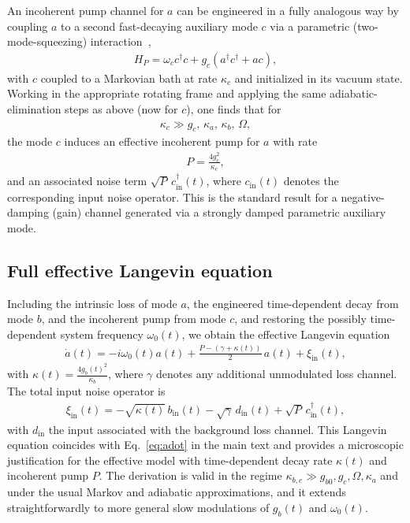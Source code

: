\documentclass[prl,twocolumn,floatfix,10pt,superscriptaddress]{revtex4-2}
\begin{document}
An incoherent pump channel for $a$ can be engineered in a fully analogous way by coupling $a$ to a second fast-decaying auxiliary mode $c$ via a parametric (two-mode-squeezing) interaction~\cite{Roushan2017,Busnaina2024},
\begin{align}
H_P = \omega_c c^\dagger c + g_c (a^\dagger c^\dagger + a c),
\end{align}
with $c$ coupled to a Markovian bath at rate $\kappa_c$ and initialized in its vacuum state. Working in the appropriate rotating frame and applying the same adiabatic-elimination steps as above (now for $c$), one finds that for
\begin{align}
\kappa_c \gg g_c,\, \kappa_a,\, \kappa_b,\, \Omega,
\end{align}
the mode $c$ induces an effective incoherent pump for $a$ with rate
\begin{align}
P = \frac{4 g_c^2}{\kappa_c},
\end{align}
and an associated noise term $\sqrt{P}\, c_{\text{in}}^\dagger(t)$, where $c_{\text{in}}(t)$ denotes the corresponding input noise operator. This is the standard result for a negative-damping (gain) channel generated via a strongly damped parametric auxiliary mode.

\subsection{Full effective Langevin equation}

Including the intrinsic loss of mode $a$, the engineered time-dependent decay from mode $b$, and the incoherent pump from mode $c$, and restoring the possibly time-dependent system frequency $\omega_0(t)$, we obtain the effective Langevin equation
\begin{align}
\dot{a}(t)
= -i \omega_0(t) a(t)
+ \frac{P - (\gamma + \kappa(t))}{2}\, a(t)
+ \xi_\mathrm{in}(t),
\end{align}
with $\kappa(t) = \frac{4 g_b(t)^2}{\kappa_b}$, where $\gamma$ denotes any additional unmodulated loss channel. The total input noise operator is
\begin{align}
\xi_\mathrm{in}(t)
= -\sqrt{\kappa(t)}\, b_{\text{in}}(t)
  -\sqrt{\gamma}\, d_{\text{in}}(t)
  +\sqrt{P}\, c_{\text{in}}^\dagger(t),
\end{align}
with $d_{\text{in}}$ the input associated with the background loss channel. This Langevin equation coincides with Eq.~\eqref{eq:adot} in the main text and provides a microscopic justification for the effective model with time-dependent decay rate $\kappa(t)$ and incoherent pump $P$. The derivation is valid in the regime $\kappa_{b,c} \gg g_{b0}, g_c, \Omega, \kappa_a$ and under the usual Markov and adiabatic approximations, and it extends straightforwardly to more general slow modulations of $g_b(t)$ and $\omega_0(t)$. 
\end{document}
